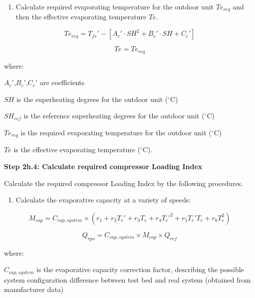 \begin{enumerate}
\def\labelenumi{(\arabic{enumi})}
\setcounter{enumi}{1}
\tightlist
\item
  Calculate required evaporating temperature for the outdoor unit \(Te_{req}\) and then the effective evaporating temperature \(Te\).
\end{enumerate}

\begin{equation}
Te_{req} = {T_{fs}}'-[{A_c}'\cdot SH^2+{B_c}'\cdot SH+{C_c}']
\end{equation}

\begin{equation}
Te = Te_{req}
\end{equation}

where:

\({A_c}'\),\({B_c}'\),\({C_c}'\) are coefficients

\(SH\) is the superheating degrees for the outdoor unit (\(^{\circ}\)C)

\(SH_{ref}\) is the reference superheating degrees for the outdoor unit (\(^{\circ}\)C)

\(Te_{req}\) is the required evaporating temperature for the outdoor unit (\(^{\circ}\)C)

\(Te\) is the effective evaporating temperature (\(^{\circ}\)C).

\textbf{Step 2h.4: Calculate required compressor Loading Index}

Calculate the required compressor Loading Index by the following procedures.

\begin{enumerate}
\def\labelenumi{\alph{enumi}.}
\tightlist
\item
  Calculate the evaporative capacity at a variety of speeds:
\end{enumerate}

\begin{equation}
  M_{cap} = C_{cap,system}\times(r_1+r_2{T_c}'+r_3T_e+r_4{T_c}'^2+r_5{T_c}'T_e+r_6T_e^2)
\end{equation}

\begin{equation}
  Q_{rps} = C_{cap,system} \times M_{cap} \times Q_{ref}
\end{equation}

where:

\(C_{cap,system}\) is the evaporative capacity correction factor, describing the possible system configuration difference between test bed and real system (obtained from manufacturer data)

